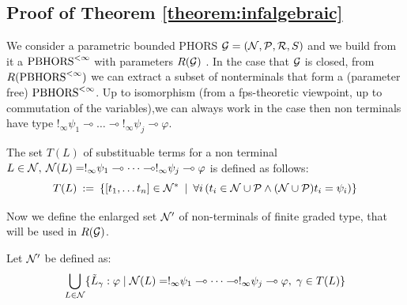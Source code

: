 \subsection{Proof of Theorem \ref{theorem:infalgebraic} }
We consider a parametric bounded PHORS $\mathcal{G}=(\mathcal{N}, \mathcal{P},\mathcal{R}, S)$ and we build from it a $\text{PBHORS}^{<\infty}$ with parameters $R(\mathcal{G})$ . In the case that $\mathcal{G}$ is closed, from $R(\text{PBHORS}^{<\infty})$ we can extract a subset of nonterminals that form a (parameter free) $\text{PBHORS}^{<\infty}$. Up to isomorphism (from a fps-theoretic viewpoint, up to commutation of the variables),we can always work in the case then non terminals have type $ !_{\infty} \psi_1 \multimap \dots\multimap  !_{\infty} \psi_j \multimap \varphi$. 
\begin{definition}
	The set $T(L)$ of substituable terms for a non terminal $L \in \mathcal{N}, \: \mathcal{N}(L)= !_{\infty} \psi_1 \multimap \dots\multimap  !_{\infty} \psi_j \multimap \varphi$ is defined as follows:
	$$T(L) \: := \: \{[t_1, \dots t_n] \in \mathcal{N}^* \: \mid \: \forall i \, (t_i \in \mathcal{N} \cup \mathcal{P}\land (\mathcal{N} \cup \mathcal{P}) t_i = \psi_i)  \}  $$
\end{definition}
Now we define the enlarged set $\mathcal{N}'$ of non-terminals of finite graded type, that will be used in $R(\mathcal{G})$.
\begin{definition}
	Let $\mathcal{N}'$ be defined as:
	$$\bigcup_{L \in \mathcal{N}}\{\tilde{L}_\gamma : \varphi \mid \mathcal{N}(L)=!_{\infty} \psi_1 \multimap \dots\multimap  !_{\infty} \psi_j \multimap \varphi, \;  \gamma \in T(L)\} $$
\end{definition}

